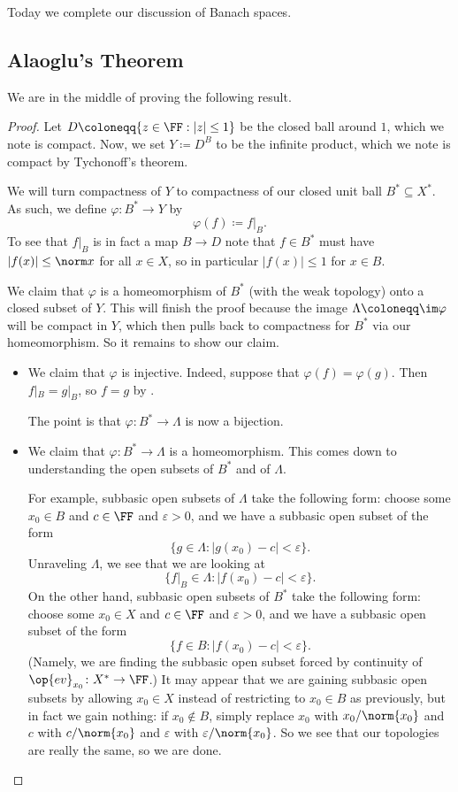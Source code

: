 \documentclass[../notes.tex]{subfiles}
\begin{document}
Today we complete our discussion of Banach spaces.

\subsection{Alaoglu's Theorem}
We are in the middle of proving the following result.
\aballthm*
\begin{proof}
	Let $D\coloneqq\{z\in\FF:\left|z\right|\le1\}$ be the closed ball around $1$, which we note is compact. Now, we set $Y\coloneqq D^B$ to be the infinite product, which we note is compact by Tychonoff's theorem.

	We will turn compactness of $Y$ to compactness of our closed unit ball $B^*\subseteq X^*$. As such, we define $\varphi\colon B^*\to Y$ by
	\[\varphi(f)\coloneqq f|_B.\]
	To see that $f|_B$ is in fact a map $B\to D$ note that $f\in B^*$ must have $\left|f(x)\right|\le\norm x$ for all $x\in X$, so in particular $\left|f(x)\right|\le1$ for $x\in B$.

	We claim that $\varphi$ is a homeomorphism of $B^*$ (with the weak topology) onto a closed subset of $Y$. This will finish the proof because the image $\Lambda\coloneqq\im\varphi$ will be compact in $Y$, which then pulls back to compactness for $B^*$ via our homeomorphism. So it remains to show our claim.
	\begin{itemize}
		\item We claim that $\varphi$ is injective. Indeed, suppose that $\varphi(f)=\varphi(g)$. Then $f|_B=g|_B$, so $f=g$ by .

		The point is that $\varphi\colon B^*\to\Lambda$ is now a bijection.

		\item We claim that $\varphi\colon B^*\to\Lambda$ is a homeomorphism. This comes down to understanding the open subsets of $B^*$ and of $\Lambda$.

		For example, subbasic open subsets of $\Lambda$ take the following form: choose some $x_0\in B$ and $c\in\FF$ and $\varepsilon>0$, and we have a subbasic open subset of the form
		\[\{g\in\Lambda:\left|g(x_0)-c\right|<\varepsilon\}.\]
		Unraveling $\Lambda$, we see that we are looking at
		\[\{f|_B\in\Lambda:\left|f(x_0)-c\right|<\varepsilon\}.\]
		On the other hand, subbasic open subsets of $B^*$ take the following form: choose some $x_0\in X$ and $c\in\FF$ and $\varepsilon>0$, and we have a subbasic open subset of the form
		\[\{f\in B:\left|f(x_0)-c\right|<\varepsilon\}.\]
		(Namely, we are finding the subbasic open subset forced by continuity of $\op{ev}_{x_0}\colon X^*\to\FF$.) It may appear that we are gaining subbasic open subsets by allowing $x_0\in X$ instead of restricting to $x_0\in B$ as previously, but in fact we gain nothing: if $x_0\notin B$, simply replace $x_0$ with $x_0/\norm{x_0}$ and $c$ with $c/\norm{x_0}$ and $\varepsilon$ with $\varepsilon/\norm{x_0}$. So we see that our topologies are really the same, so we are done.


\end{itemize}
\end{proof}
\end{document}
